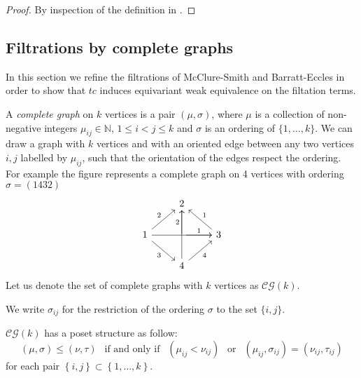 \begin{proof}
	By inspection of the definition in \cite{BFsmall}.%
\end{proof}



\subsection{Filtrations by complete graphs}
In this section we refine the filtrations of McClure-Smith and Barratt-Eccles in order to show that $tc$ induces equivariant weak equivalence on the filtation terms.

\begin{definition}
	A \textit{complete graph} on $k$ vertices is
	a pair $(\mu,\sigma)$, where $\mu$ is a collection of non-negative integers $\mu_{ij}\in\mathbb{N}$, $1 \leq i < j \leq k$
	and $\sigma$ is an ordering of
	$\{1,\dots,k\}$.
	We can draw a graph with $k$ vertices and with an oriented edge between any two vertices $i,j$
	labelled by $\mu_{ij}$, such that the orientation of the edges respect the ordering.
	For example the figure represents a complete graph on 4 vertices with ordering $\sigma=(1432)$
	\begin{equation*}
		\begin{tikzcd}
			\ & 2 & \  \\
			1 \arrow[ur,"2"] \arrow[rr] \arrow[dr,"3"']& \arrow[r,"1"] \arrow[u,"2"] & 3 \arrow[ul,"1"']  \\
			\ & 4 \arrow[ur,"4"'] \arrow[uu] & \
		\end{tikzcd}
	\end{equation*}
	Let us denote the set of complete graphs with $k$ vertices as $\mathcal{CG}(k)$.

	We write $\sigma_{ij}$ for the restriction of the ordering $\sigma$ to the set $\{i,j\}$.
\end{definition}

\begin{definition}
	$\mathcal{CG}(k)$ has a poset structure as follow:
	\begin{equation*}
		(\mu,\sigma)\le (\nu,\tau) \ \ \text{ if and only if } \ \ (\mu_{ij}<\nu_{ij}) \ \ \text{ or } \ \ (\mu_{ij},\sigma_{ij})= (\nu_{ij},\tau_{ij})
	\end{equation*}
	for each pair $\left\lbrace i,j\right\rbrace \subset\left\lbrace 1,\dots,k  \right\rbrace $.
\end{definition}

